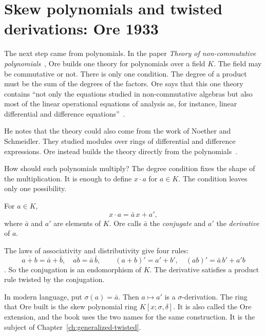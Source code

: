 \section[Skew polynomials and twisted derivations: Ore 1933][Skew polynomials and twisted derivations]{Skew polynomials and twisted derivations: Ore 1933}\label{sec:origins:ore-and-twists}

The next step came from polynomials. In the paper \emph{Theory of non-commutative polynomials}~\cite{Ore1933}, Ore
builds one theory for polynomials over a field $K$. The field may be
commutative or not. There is only one condition. The degree of a product must
be the sum of the degrees of the factors. Ore says that this one theory
contains ``not only the equations studied in non-commutative algebras but
also most of the linear operational equations of analysis as, for instance,
linear differential and difference equations''~\cite[p.~480]{Ore1933}.

He notes that the theory could also come from the work of Noether and
Schmeidler. They studied modules over rings of differential and difference
expressions. Ore instead builds the theory directly from the
polynomials~\cite[p.~480]{Ore1933}.

How should such polynomials multiply? The degree condition fixes the shape of the multiplication. It is enough to
define $x\cdot a$ for $a \in K$. The condition leaves only one possibility.

\begin{definition}\label{def:origins:ore}
For $a \in K$,
\[
x\cdot a = \bar a\, x + a',
\]
where $\bar a$ and $a'$ are elements of $K$. Ore calls $\bar a$ the
\emph{conjugate} and $a'$ the \emph{derivative} of $a$.
\end{definition}

The laws of associativity and distributivity give four rules:
\[
\overline{a+b} = \bar a + \bar b,\quad \overline{ab} = \bar a\,\bar b,\qquad
(a+b)' = a' + b',\quad (ab)' = \bar a\, b' + a' b
\]
\cite[p.~482, (4)--(5)]{Ore1933}. So the conjugation is an endomorphism of
$K$. The derivative satisfies a product rule twisted by the conjugation.

In modern language, put $\sigma(a) = \bar a$. Then $a \mapsto a'$ is a $\sigma$-derivation. The
ring that Ore built is the skew polynomial ring $K[x;\sigma,\delta]$. It is
also called the Ore extension, and the book uses the two names for the same
construction. It is the subject of Chapter~\ref{ch:generalized-twisted}.

